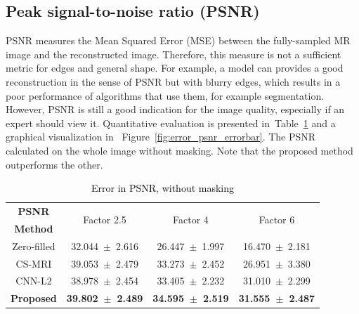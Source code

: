 \documentclass[review]{elsarticle}
\begin{document}
\subsection{Peak signal-to-noise ratio (PSNR)}
PSNR measures the Mean Squared Error (MSE) between the fully-sampled MR image and the reconstructed image. Therefore, this measure is not a sufficient metric for edges and general shape. For example, a model can provides a good reconstruction in the sense of PSNR but with blurry edges, which results in a poor performance of algorithms that use them, for example segmentation.
However, PSNR is still a good indication for the image quality, especially if an expert should view it.
Quantitative evaluation is presented in~Table~\ref{tbl:PSNR_NO_MASK} and a graphical visualization in ~Figure~\ref{fig:error_psnr_errorbar}. The PSNR calculated on the whole image without masking. Note that the proposed method outperforms the other.

%


\begin{table}[H]
	\centering{}
	\begin{tabular}{|c||c||c||c|}
		\hline 
		\textbf{PSNR} & \multicolumn{1}{c||}{\multirow{2}{*}{Factor 2.5}} & \multicolumn{1}{c||}{\multirow{2}{*}{Factor 4}} & \multicolumn{1}{c|}{\multirow{2}{*}{Factor 6}} \tabularnewline
		\textbf{Method} & \multicolumn{1}{c||}{} & \multicolumn{1}{c||}{} & \multicolumn{1}{c|}{} \tabularnewline \cline{1-4}
		
		Zero-filled         &32.044~$\pm$~2.616  &26.447~$\pm$~1.997   &16.470~$\pm$~2.181\tabularnewline
		CS-MRI              &39.053~$\pm$~2.479  &33.273~$\pm$~2.452   &26.951~$\pm$~3.380\tabularnewline
		CNN-L2              &38.978~$\pm$~2.454  &33.405~$\pm$~2.232   &31.010~$\pm$~2.299\tabularnewline
		\textbf{Proposed}   &\textbf{39.802~$\pm$~2.489}  &\textbf{34.595~$\pm$~2.519}   &\textbf{31.555~$\pm$~2.487}\tabularnewline
		\hline 
	\end{tabular}\caption{\textcolor{black}{\footnotesize{}{}Error in PSNR, without masking}{\footnotesize{}\label{tbl:PSNR_NO_MASK}}}
\end{table}
\end{document}
